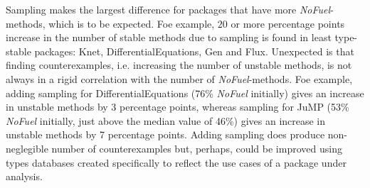 Sampling makes the largest difference for packages that have more
\emph{NoFuel}-methods, which is to be expected. Foe example, $20$ or more
percentage points increase in the number of stable methods due to sampling is
found in least type-stable packages: Knet, DifferentialEquations, Gen and Flux.
Unexpected is that finding counterexamples, i.e. increasing
the number of unstable methods, is not always in a rigid correlation with the
number of \emph{NoFuel}-methods. Foe example, adding sampling for DifferentialEquations
(76\% \emph{NoFuel} initially) gives an increase in unstable methods by 3 percentage
points, whereas sampling for JuMP (53\% \emph{NoFuel} initially, just above the median value
of 46\%) gives an increase in unstable methods by 7 percentage points. Adding
sampling does produce non-neglegible number of counterexamples but, perhaps, could
be improved using types databases created specifically to reflect the use cases
of a package under analysis.
